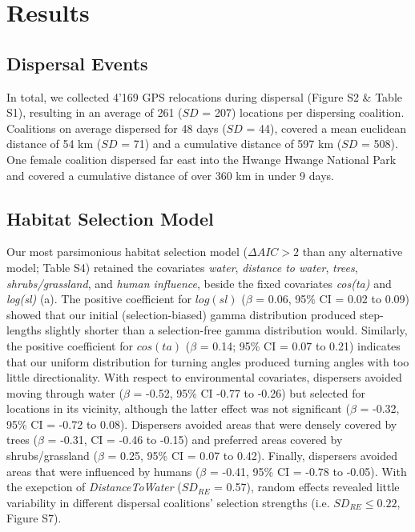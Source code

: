 \documentclass[abstract=on,10pt,a4paper,bibliography=totocnumbered]{article}
\begin{document}
\section{Results}
\subsection{Dispersal Events}
In total, we collected 4'169 GPS relocations during dispersal (Figure S2 \&
Table S1), resulting in an average of 261 (\(SD\) = 207) locations per
dispersing coalition. Coalitions on average dispersed for 48 days (\(SD\) =
44), covered a mean euclidean distance of 54 km (\(SD\) = 71) and a cumulative
distance of 597 km (\(SD\) = 508). One female coalition dispersed far east into
the Hwange Hwange National Park and covered a cumulative distance of over 360 km
in under 9 days.

\subsection{Habitat Selection Model}
Our most parsimonious habitat selection model (\(\Delta AIC > 2\) than any
alternative model; Table S4) retained the covariates \textit{water},
\textit{distance to water}, \textit{trees}, \textit{shrubs/grassland}, and
\textit{human influence}, beside the fixed covariates \textit{cos(ta)} and
\textit{log(sl)} (a). The positive coefficient for
\(log(sl)\) (\(\beta\) = 0.06, 95\% CI = 0.02 to 0.09) showed that our initial
(selection-biased) gamma distribution produced step-lengths slightly shorter
than a selection-free gamma distribution would. Similarly, the positive
coefficient for \(cos(ta)\) (\(\beta\) = 0.14; 95\% CI = 0.07 to 0.21) indicates
that our uniform distribution for turning angles produced turning angles with
too little directionality.  With respect to environmental covariates, dispersers avoided
moving through water (\(\beta\) = -0.52, 95\% CI -0.77 to -0.26) but selected
for locations in its vicinity, although the latter effect was not significant
(\(\beta\) = -0.32, 95\% CI = -0.72 to 0.08). Dispersers avoided areas that were
densely covered by trees (\(\beta\) = -0.31, CI = -0.46 to -0.15) and preferred
areas covered by shrubs/grassland (\(\beta\) = 0.25, 95\% CI = 0.07 to 0.42).
Finally, dispersers avoided areas that were influenced by humans (\(\beta\) =
-0.41, 95\% CI = -0.78 to -0.05). With the exepction of \textit{DistanceToWater}
(\(SD_{RE}\) = 0.57), random effects revealed little variability in different
dispersal coalitions' selection strengths (i.e. \(SD_{RE} \leq 0.22\), Figure
S7).
\end{document}
